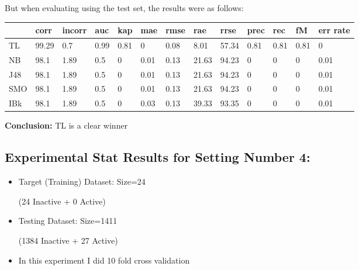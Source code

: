 \documentclass[a4paper,12pt, english]{article}
\begin{document}
But when evaluating using the test set, the results were as follows:
\begin{small}
\begin{center}
    \begin{tabular}{ | l | l | l | l | l | l | l | l | l | l | l | l | l |}
    \hline
      	& corr & incorr  & auc & kap & mae & rmse & rae & rrse & prec & rec & fM & err rate\\ \hline
      	TL & 99.29 & 0.7 & 0.99 & 0.81 & 0 & 0.08 & 8.01 & 57.34 & 0.81 & 0.81 & 0.81 & 0\\ \hline
	NB & 98.1 & 1.89 & 0.5 & 0 & 0.01 & 0.13 & 21.63 & 94.23 & 0 & 0 & 0 & 0.01\\ \hline
	J48 & 98.1 & 1.89 & 0.5 & 0 & 0.01 & 0.13 & 21.63 & 94.23 & 0 & 0 & 0 & 0.01\\ \hline
	SMO & 98.1 & 1.89 & 0.5 & 0 & 0.01 & 0.13 & 21.63 & 94.23 & 0 & 0 & 0 & 0.01\\ \hline
	IBk & 98.1 & 1.89 & 0.5 & 0 & 0.03 & 0.13 & 39.33 & 93.35 & 0 & 0 & 0 & 0.01\\ \hline  
    \end{tabular}       
\end{center}
\end{small}
\textbf{Conclusion:} TL is a clear winner

\newpage

\subsection{Experimental Stat Results for Setting Number 4:}
\begin{itemize}
\item Target (Training) Dataset: Size=24 \begin{scriptsize}(24 Inactive + 0 Active)\end{scriptsize}
\item Testing Dataset: Size=1411 \begin{scriptsize}(1384 Inactive + 27 Active)\end{scriptsize}
\item In this experiment I did 10 fold cross validation
\end{itemize}  
\end{document}
